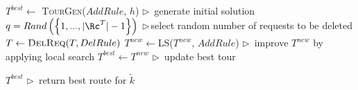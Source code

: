 \begin{algorithmic}[1]
    \State $T^{best} \leftarrow$ \textsc{TourGen($AddRule$, $h$)}
{\hfill \hspace{.6cm}$\triangleright \,$ generate initial solution}
	\Repeat
		\State $q = Rand\left(\left\lbrace 1,...,|\Rc^T|-1\right\rbrace\right)$ {\hfill  \hspace{.6cm}$\triangleright \,$select random number of requests to be deleted}
			\State $T \leftarrow \textsc{DelReq}(T, DelRule)$
		\EndFor
		\State $T^{new} \leftarrow$\textsc{LS}($T^{new}$, $AddRule$) {\hfill  \hspace{.6cm}$\triangleright \,$ improve $T^{new}$ by applying local search}
		    \State $T^{best} \leftarrow T^{new}$ {\hfill  \hspace{.6cm}$\triangleright \,$ update best tour}				
		\EndIf

	\State 	\Return $T^{best}$ {\hfill  \hspace{.6cm}$\triangleright \,$ return best route for $\tilde{k}$}
\EndProcedure
\end{algorithmic}
